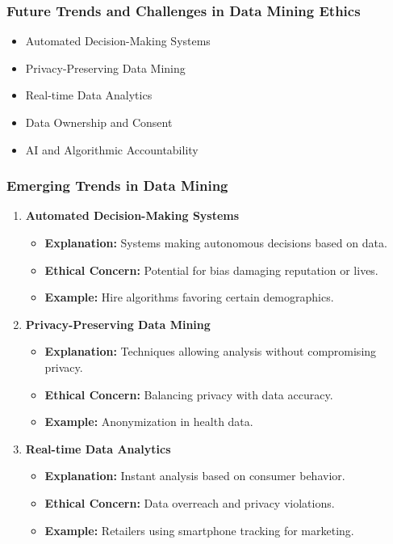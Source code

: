 \documentclass[aspectratio=169]{beamer}
\begin{document}
\begin{frame}[fragile]
  \frametitle{Future Trends and Challenges in Data Mining Ethics}
  \begin{itemize}
    \item Automated Decision-Making Systems
    \item Privacy-Preserving Data Mining
    \item Real-time Data Analytics
    \item Data Ownership and Consent
    \item AI and Algorithmic Accountability
  \end{itemize}
\end{frame}

\begin{frame}[fragile]
  \frametitle{Emerging Trends in Data Mining}
  \begin{enumerate}
    \item \textbf{Automated Decision-Making Systems}
      \begin{itemize}
        \item \textbf{Explanation:} Systems making autonomous decisions based on data.
        \item \textbf{Ethical Concern:} Potential for bias damaging reputation or lives.
        \item \textbf{Example:} Hire algorithms favoring certain demographics.
      \end{itemize}

    \item \textbf{Privacy-Preserving Data Mining}
      \begin{itemize}
        \item \textbf{Explanation:} Techniques allowing analysis without compromising privacy.
        \item \textbf{Ethical Concern:} Balancing privacy with data accuracy.
        \item \textbf{Example:} Anonymization in health data.
      \end{itemize}

    \item \textbf{Real-time Data Analytics}
      \begin{itemize}
        \item \textbf{Explanation:} Instant analysis based on consumer behavior.
        \item \textbf{Ethical Concern:} Data overreach and privacy violations.
        \item \textbf{Example:} Retailers using smartphone tracking for marketing.
      \end{itemize}
  \end{enumerate}
\end{frame}
\end{document}

